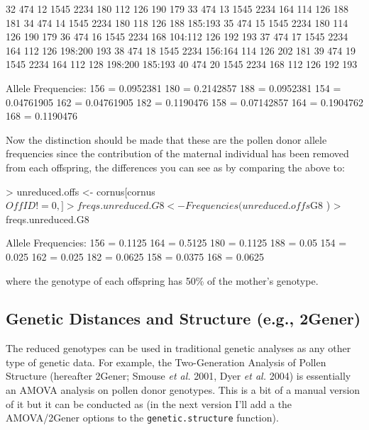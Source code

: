 \documentclass[letterpaper,twoside,openany]{book}
\begin{document}
\begin{Schunk}
\begin{Soutput}
32   474    12 1545 2234     180     112 126     190     179
33   474    13 1545 2234     164     114 126     188     181
34   474    14 1545 2234     180     118 126     188 185:193
35   474    15 1545 2234     180     114 126     190     179
36   474    16 1545 2234     168 104:112 126     192     193
37   474    17 1545 2234     164     112 126 198:200     193
38   474    18 1545 2234 156:164     114 126     202     181
39   474    19 1545 2234     164     112 128 198:200 185:193
40   474    20 1545 2234     168     112 126     192     193
\end{Soutput}
\begin{Soutput}
Allele Frequencies:
  156 = 0.0952381 
  180 = 0.2142857 
  188 = 0.0952381 
  154 = 0.04761905 
  162 = 0.04761905 
  182 = 0.1190476 
  158 = 0.07142857 
  164 = 0.1904762 
  168 = 0.1190476 
\end{Soutput}
\end{Schunk}

Now the distinction should be made that these are the pollen donor allele frequencies since the contribution of the maternal individual has been removed from each offspring, the differences you can see as by comparing the above to:

\begin{Schunk}
\begin{Sinput}
> unreduced.offs <- cornus[cornus$OffID!=0,]
> freqs.unreduced.G8 <- Frequencies( unreduced.offs$G8 )
> freqs.unreduced.G8
\end{Sinput}
\begin{Soutput}
Allele Frequencies:
  156 = 0.1125 
  164 = 0.5125 
  180 = 0.1125 
  188 = 0.05 
  154 = 0.025 
  162 = 0.025 
  182 = 0.0625 
  158 = 0.0375 
  168 = 0.0625 
\end{Soutput}
\end{Schunk}

where the genotype of each offspring has 50\% of the mother's genotype.

\subsection{Genetic Distances and Structure (e.g., 2Gener)}

The reduced genotypes can be used in traditional genetic analyses as any other type of genetic data.  For example, the Two-Generation Analysis of Pollen Structure (hereafter 2Gener; Smouse \emph{et al.} 2001, Dyer \emph{et al.} 2004) is essentially an AMOVA analysis on pollen donor genotypes.  This is a bit of a manual version of it but it can be conducted as (in the next version I'll add a the AMOVA/2Gener options to the \texttt{genetic.structure} function).
\end{document}

